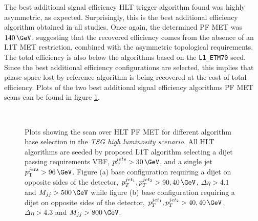 The best additional signal efficiency \gls{HLT} trigger algorithm found was highly asymmetric, as expected. Surprisingly, this is the best additional efficiency algorithm obtained in all studies. Once again, the determined \gls{PF} \gls{MET} was $140\,\GeV$, suggesting that the recovered efficiency comes from the absence of an \gls{L1T} \gls{MET} restriction, combined with the asymmetric topological requirements. The total efficiency is also below the algorithms based on the \verb|L1_ETM70| seed. Since the best additional efficiency configurations are selected, this implies that phase space lost by reference algorithm is being recovered at the cost of total efficiency. Plots of the two best additional signal efficiency algorithms \gls{PF} \gls{MET} scans can be found in figure \ref{FIGURE:RunIITriggerStudies_HLT_Seed_L1TDijetSingleJet}.

\begin{figure}[!htp]%
\centering
{}\qquad
{}\\
\caption{Plots showing the scan over \gls{HLT} \gls{PF} \gls{MET} for different algorithm base selection in the \textit{\gls{TSG} high luminosity scenario}. All \gls{HLT} algorithms are seeded by proposed \gls{L1T} algorithm selecting a dijet passing requirements \gls{VBF}, $\pt^{jets}>30\,\GeV$, and a single jet $\pt^{jets}>96\,\GeV$. Figure (a) base configuration requiring a dijet on opposite sides of the detector, $p_T^{jet_1},p_T^{jet_2}>90,40\,\GeV$, $\Delta\eta>4.1$ and $M_{jj}>500\,\GeV$ while figure (b) base configuration requiring a dijet on opposite sides of the detector, $p_T^{jet_1},p_T^{jet_2}>40,40\,\GeV$, $\Delta\eta>4.3$ and $M_{jj}>800\,\GeV$.}
\label{FIGURE:RunIITriggerStudies_HLT_Seed_L1TDijetSingleJet}
\end{figure}

